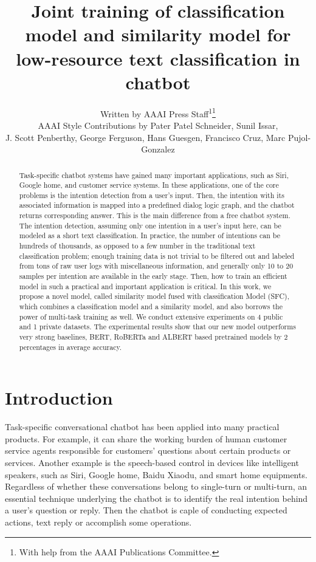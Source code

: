 \documentclass[letterpaper]{article} %
\title{     
  Joint training of classification model and similarity model for low-resource
  text classification in chatbot
}
\author{
  Written by AAAI Press Staff\textsuperscript{\rm 1}\thanks{With help from the AAAI Publications Committee.}\\
  AAAI Style Contributions by Pater Patel Schneider,
  Sunil Issar,  \\
  J. Scott Penberthy,
  George Ferguson,
  Hans Guesgen,
  Francisco Cruz,
  Marc Pujol-Gonzalez
  \\
}
\begin{document}
  \maketitle

  \begin{abstract}
    Task-specific  chatbot systems have gained many important applications, such
    as  Siri,  Google home, and customer service systems. In these applications,
    one  of  the  core  problems is the intention detection from a user's input.
    Then,  the  intention  with  its  associated  information  is  mapped into a
    predefined dialog logic graph, and the chatbot returns corresponding answer.
    This  is  the  main  difference  from  a  free chatbot system. The intention
    detection,  assuming  only  one  intention  in  a  user's input here, can be
    modeled  as  a  short  text  classification.  In  practice,  the  number  of
    intentions  can  be hundreds of thousands, as opposed to a few number in the
    traditional text classification problem; enough training data is not trivial
    to be filtered out and labeled from tons of raw user logs with miscellaneous
    information, and generally only 10 to 20 samples per intention are available
    in  the  early  stage.  Then,  how  to  train  an  efficient model in such a
    practical  and important application is critical. In this work, we propose a
    novel  model, called similarity model fused with classification Model (SFC),
    which  combines  a  classification  model  and  a similarity model, and also
    borrows  the  power  of  multi-task  training  as well. We conduct extensive
    experiments  on  4  public  and 1 private datasets. The experimental results
    show that our new model outperforms very strong baselines, BERT, RoBERTa and
    ALBERT based pretrained models by 2 percentages in average accuracy.

  \end{abstract}

  \section{Introduction}
  \label{sec:intro}

  Task-specific  conversational  chatbot  \cite{wen2016network}  has been applied
  into  many practical products. For example, it can share the working burden of
  human  customer  service  agents  responsible  for  customers' questions about
  certain  products  or services. Another example is the speech-based control in
  devices  like  intelligent  speakers, such as Siri, Google home, Baidu Xiaodu,
  and smart home equipments. Regardless of whether these conversations belong to
  single-turn or multi-turn, an essential technique underlying the chatbot is to
  identify  the  real  intention  behind  a  user's  question or reply. Then the
  chatbot  is caple of conducting expected actions, text reply or accomplish some
  operations.
\end{document}
